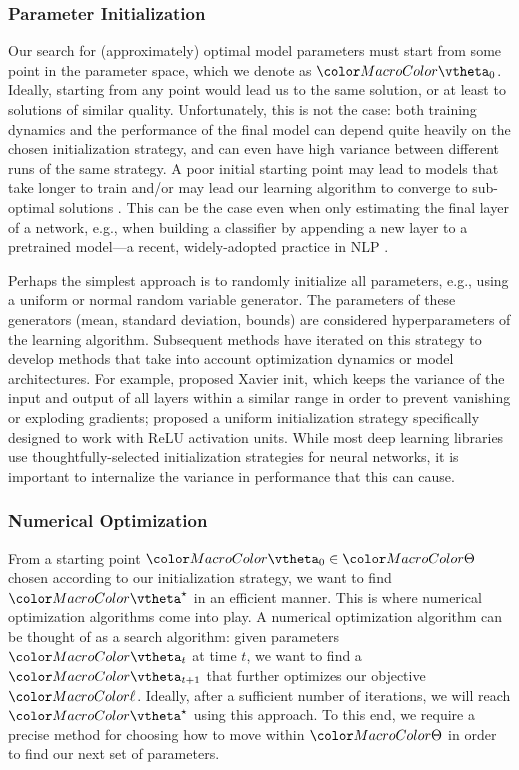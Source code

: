 \subsubsection{Parameter Initialization}
Our search for (approximately) optimal model parameters must start from some point in the parameter space, which we denote as $\modelparams_0$. Ideally, starting from any point would lead us to the same solution, or at least to solutions of similar quality. Unfortunately, this is not the case: both training dynamics and the performance of the final model can depend quite heavily on the chosen initialization strategy, and can even have high variance between different runs of the same strategy. A poor initial starting point  may lead to models that take longer to train and/or may lead our learning algorithm to converge to sub-optimal solutions \citep{Dodge2020FineTuningPL,sellam2022the}. This can be the case even when only estimating the final layer of a network, e.g., when building a classifier by appending a new layer to a pretrained model---a recent, widely-adopted practice in NLP \citep{Dodge2020FineTuningPL}. 


Perhaps the simplest approach is to randomly initialize all parameters, e.g., using a uniform or normal random variable generator. The parameters of these generators (mean, standard deviation, bounds) are considered hyperparameters of the learning algorithm. Subsequent methods have iterated on this strategy to develop methods that take into account optimization dynamics or model architectures. For example, \cite{pmlr-v9-glorot10a} proposed Xavier init, which keeps the variance of the input and output of all layers within a similar range in order to prevent vanishing or exploding gradients; \cite{he_initialization} proposed a uniform initialization strategy specifically designed to work with ReLU activation units. While most deep learning libraries use thoughtfully-selected initialization strategies for neural networks, it is important to internalize the variance in performance that this can cause.
%


\subsubsection{Numerical Optimization}
From a starting point $\modelparams_0 \in \paramspace$ chosen according to our initialization strategy, we want to find $\modelparams^\star$ in an efficient manner. 
 This is where numerical optimization algorithms come into play. 
A numerical optimization algorithm can be thought of as a search algorithm: given parameters $\modelparams_t$ at time $t$, we want to find a $\modelparams_{t+1}$ that further optimizes our objective $\loss$. Ideally, after a sufficient number of iterations, we will reach $\modelparams^\star$ using this approach. 
To this end, we require a precise method for choosing how to move within $\paramspace$ in order to find our next set of parameters. 

